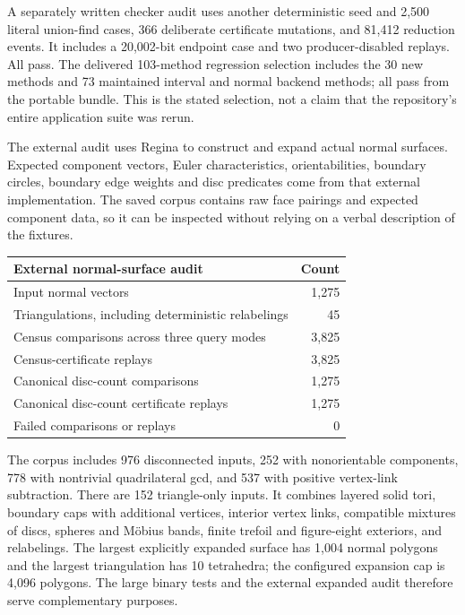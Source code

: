 A separately written checker audit uses another deterministic seed and
2,500 literal union-find cases, 366 deliberate certificate mutations, and
81,412 reduction events. It includes a 20,002-bit endpoint case and two
producer-disabled replays. All pass. The delivered 103-method regression
selection includes the 30 new methods and 73 maintained interval and normal
backend methods; all pass from the portable bundle. This is the stated
selection, not a claim that the repository's entire application suite was
rerun.

The external audit uses Regina \cite{Regina} to construct and expand actual
normal surfaces. Expected component vectors, Euler characteristics,
orientabilities, boundary circles, boundary edge weights and disc predicates
come from that external implementation. The saved corpus contains raw face
pairings and expected component data, so it can be inspected without relying
on a verbal description of the fixtures.

\begin{center}
\begin{tabular}{lr}
\toprule
External normal-surface audit & Count \\
\midrule
Input normal vectors & 1,275 \\
Triangulations, including deterministic relabelings & 45 \\
Census comparisons across three query modes & 3,825 \\
Census-certificate replays & 3,825 \\
Canonical disc-count comparisons & 1,275 \\
Canonical disc-count certificate replays & 1,275 \\
Failed comparisons or replays & 0 \\
\bottomrule
\end{tabular}
\end{center}

The corpus includes 976 disconnected inputs, 252 with nonorientable
components, 778 with nontrivial quadrilateral gcd, and 537 with positive
vertex-link subtraction. There are 152 triangle-only inputs. It combines
layered solid tori, boundary caps with additional vertices, interior vertex
links, compatible mixtures of discs, spheres and M\"obius bands, finite
trefoil and figure-eight exteriors, and relabelings. The largest explicitly
expanded surface has 1,004 normal polygons and the largest triangulation has
10 tetrahedra; the configured expansion cap is 4,096 polygons. The large
binary tests and the external expanded audit therefore serve complementary
purposes.

